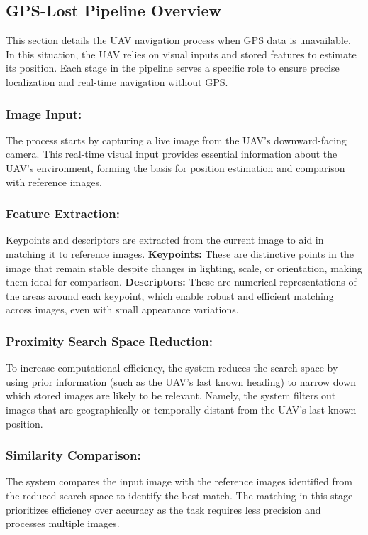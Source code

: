 





\subsection*{GPS-Lost Pipeline Overview}
This section details the UAV navigation process when GPS data is unavailable. In this situation, the UAV relies on visual inputs and stored features to estimate its position. Each stage in the pipeline serves a specific role to ensure precise localization and real-time navigation without GPS.

\subsubsection*{Image Input:}

The process starts by capturing a live image from the UAV’s downward-facing camera. This real-time visual input provides essential information about the UAV’s environment, forming the basis for position estimation and comparison with reference images.

\subsubsection*{Feature Extraction:}
Keypoints and descriptors are extracted from the current image to aid in matching it to reference images.
\textbf{Keypoints:} These are distinctive points in the image that remain stable despite changes in lighting, scale, or orientation, making them ideal for comparison.
\textbf{Descriptors:} These are numerical representations of the areas around each keypoint, which enable robust and efficient matching across images, even with small appearance variations.

\subsubsection*{Proximity Search Space Reduction:}
To increase computational efficiency, the system reduces the search space by using prior information (such as the UAV’s last known heading) to narrow down which stored images are likely to be relevant. Namely, the system filters out images that are geographically or temporally distant from the UAV’s last known position.

\subsubsection*{Similarity Comparison:}
The system compares the input image with the reference images identified from the reduced search space to identify the best match. The matching in this stage prioritizes efficiency over accuracy as the task requires less precision and processes multiple images. 

